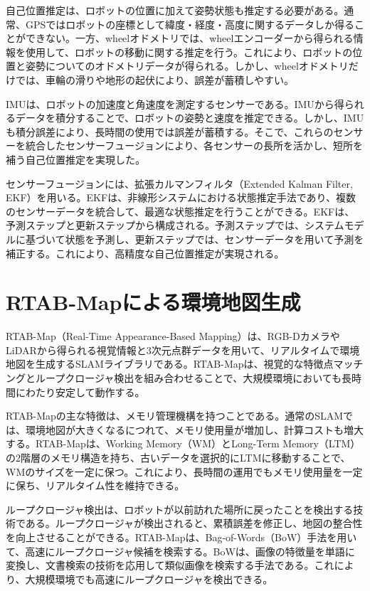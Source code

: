 自己位置推定は、ロボットの位置に加えて姿勢状態も推定する必要がある。通常、GPSではロボットの座標として緯度・経度・高度に関するデータしか得ることができない。一方、wheelオドメトリでは、wheelエンコーダーから得られる情報を使用して、ロボットの移動に関する推定を行う。これにより、ロボットの位置と姿勢についてのオドメトリデータが得られる。しかし、wheelオドメトリだけでは、車輪の滑りや地形の起伏により、誤差が蓄積しやすい。

IMUは、ロボットの加速度と角速度を測定するセンサーである。IMUから得られるデータを積分することで、ロボットの姿勢と速度を推定できる。しかし、IMUも積分誤差により、長時間の使用では誤差が蓄積する。そこで、これらのセンサーを統合したセンサーフュージョンにより、各センサーの長所を活かし、短所を補う自己位置推定を実現した。

センサーフュージョンには、拡張カルマンフィルタ（Extended Kalman Filter, EKF）を用いる。EKFは、非線形システムにおける状態推定手法であり、複数のセンサーデータを統合して、最適な状態推定を行うことができる。EKFは、予測ステップと更新ステップから構成される。予測ステップでは、システムモデルに基づいて状態を予測し、更新ステップでは、センサーデータを用いて予測を補正する。これにより、高精度な自己位置推定が実現される。

\section{RTAB-Mapによる環境地図生成}

RTAB-Map（Real-Time Appearance-Based Mapping）は、RGB-DカメラやLiDARから得られる視覚情報と3次元点群データを用いて、リアルタイムで環境地図を生成するSLAMライブラリである。RTAB-Mapは、視覚的な特徴点マッチングとループクロージャ検出を組み合わせることで、大規模環境においても長時間にわたり安定して動作する。

RTAB-Mapの主な特徴は、メモリ管理機構を持つことである。通常のSLAMでは、環境地図が大きくなるにつれて、メモリ使用量が増加し、計算コストも増大する。RTAB-Mapは、Working Memory（WM）とLong-Term Memory（LTM）の2階層のメモリ構造を持ち、古いデータを選択的にLTMに移動することで、WMのサイズを一定に保つ。これにより、長時間の運用でもメモリ使用量を一定に保ち、リアルタイム性を維持できる。

ループクロージャ検出は、ロボットが以前訪れた場所に戻ったことを検出する技術である。ループクロージャが検出されると、累積誤差を修正し、地図の整合性を向上させることができる。RTAB-Mapは、Bag-of-Words（BoW）手法を用いて、高速にループクロージャ候補を検索する。BoWは、画像の特徴量を単語に変換し、文書検索の技術を応用して類似画像を検索する手法である。これにより、大規模環境でも高速にループクロージャを検出できる。

